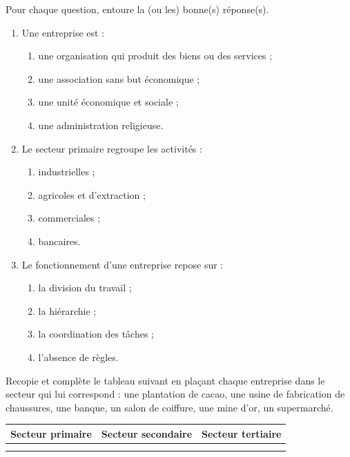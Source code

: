 \documentclass[11pt]{article}
\begin{document}
\begin{exercice}[QCM]
Pour chaque question, entoure la (ou les) bonne(s) réponse(s).
\begin{enumerate}
\item Une entreprise est :
\begin{enumerate}
\item une organisation qui produit des biens ou des services ;
\item une association sans but économique ;
\item une unité économique et sociale ;
\item une administration religieuse.
\end{enumerate}
\item Le secteur primaire regroupe les activités :
\begin{enumerate}
\item industrielles ;
\item agricoles et d'extraction ;
\item commerciales ;
\item bancaires.
\end{enumerate}
\item Le fonctionnement d'une entreprise repose sur :
\begin{enumerate}
\item la division du travail ;
\item la hiérarchie ;
\item la coordination des tâches ;
\item l'absence de règles.
\end{enumerate}
\end{enumerate}
\end{exercice}

\begin{exercice}
Recopie et complète le tableau suivant en plaçant chaque entreprise dans le secteur qui lui correspond : une plantation de cacao, une usine de fabrication de chaussures, une banque, un salon de coiffure, une mine d'or, un supermarché.

\begin{center}
\begin{tabular}{|l|l|l|}
\hline
\textbf{Secteur primaire} & \textbf{Secteur secondaire} & \textbf{Secteur tertiaire} \\
\hline
 & & \\
\hline
 & & \\
\hline
\end{tabular}
\end{center}
\end{exercice}
\end{document}
